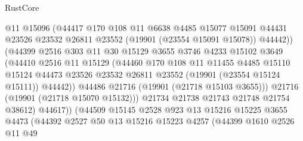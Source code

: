 \begin{lexlean}{RustCore}
\begin{coremodule}
                          @11
                          @15096
                          (@44417
                            @170
                            @108
                            @11
                            @6638
                            @4485
                            @15077
                            @15091
                            @44431
                            @23526
                            @23532
                            @26811
                            @23552
                            (@19901 (@23554 @15091 @15078))
                            @44442))
                        (@44399
                          @2516
                          @303
                          @11
                          @30
                          @15129
                          @3655
                          @3746
                          @4233
                          @15102
                          @3649
                          (@44410
                            @2516
                            @11
                            @15129
                            (@44460
                              @170
                              @108
                              @11
                              @11455
                              @4485
                              @15110
                              @15124
                              @44473
                              @23526
                              @23532
                              @26811
                              @23552
                              (@19901 (@23554 @15124 @15111))
                              @44442))
                          @44486
                          @21716
                          (@19901 (@21718 @15103 @3655)))
                        @21716
                        (@19901 (@21718 @15070 @15132)))
                      @21734
                      @21738
                      @21743
                      @21748
                      @21754
                      @38612)
                    @44617))
                (@44509
                  @15145
                  @2528
                  @923
                  @13
                  @15216
                  @15225
                  @3655
                  @4473
                  (@44392
                    @2527
                    @50
                    @13
                    @15216
                    @15223
                    @4257
                    (@44399
                      @1610
                      @2526
                      @11
                      @49

\end{coremodule}
\end{lexlean}
